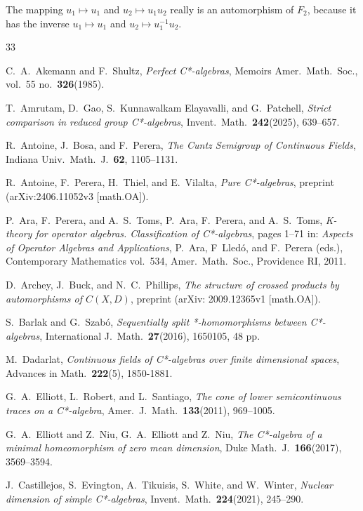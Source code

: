 \documentclass[10pt]{amsart}
\numberwithin{equation}{section}
\theoremstyle{definition}
\begin{document}
The mapping $u_1 \mapsto u_1$ and $u_2 \mapsto u_1 u_2$
really is an automorphism of $F_2$, because it has the
inverse $u_1 \mapsto u_1$ and $u_2 \mapsto u_1^{-1} u_2$.

\begin{thebibliography}{33}

 C.~A.\  Akemann and  F.~Shultz,
{\emph{Perfect C*-algebras}},
Memoirs Amer.\  Math.\  Soc., vol.~55 no.~{\textbf{326}}(1985).

T.~Amrutam, D.~Gao, S.~Kunnawalkam Elayavalli, and G.~Patchell,
{\emph{Strict comparison in reduced group C*-algebras}},
Invent.\  Math.\  {\textbf{242}}(2025), 639--657.

R.~Antoine, J.~Bosa, and F.~Perera,
{\emph{The Cuntz Semigroup of Continuous Fields}},
Indiana Univ.\  Math.\  J.\  {\textbf{62}}, 1105--1131.

R.~Antoine, F.~Perera, H.~Thiel, and E.~Vilalta,
{\emph{Pure C*-algebras}},
preprint (arXiv:2406.11052v3 [math.OA]).

P.~Ara, F.~Perera, and A.~S.\ Toms,
P.~Ara, F.~Perera, and A.~S.\  Toms,
{\emph{K-theory for operator algebras. Classification of C*-algebras}},
pages 1--71 in:
{\emph{Aspects of Operator Algebras and Applications}},
P.~Ara, F~Lled\'{o}, and F.~Perera (eds.),
Contemporary Mathematics vol.~534,
Amer.\  Math.\  Soc., Providence RI, 2011.

D.~Archey, J.~Buck, and N.~C.\ Phillips,
{\emph{The structure of
crossed products by automorphisms of $C (X, D)$}},
preprint (arXiv: 2009.12365v1 [math.OA]).

S.~Barlak and G.~Szab\'{o},
{\emph{Sequentially split *-homomorphisms between C*-algebras}},
International J.\  Math.\ {\textbf{27}}(2016), 1650105, 48 pp.

M.~Dadarlat,
{\emph{Continuous fields of C*-algebras over finite dimensional spaces}},
Advances in Math.\   {\textbf{222}}(5), 1850-1881.

G.~A.\  Elliott, L.~Robert, and L.~Santiago,
{\emph{The cone of lower semicontinuous traces on a C*-algebra}},
Amer.\  J.\  Math.\  {\textbf{133}}(2011), 969--1005.

 G.~A.\  Elliott and Z.~Niu,
G.~A.\  Elliott and Z.~Niu,
{\emph{The C*-algebra of a minimal homeomorphism of zero mean
  dimension}},
Duke Math.~J.\  {\textbf{166}}(2017), 3569--3594.

J.~Castillejos, S.~Evington, A.~Tikuisis, S.~White, and W.~Winter,
{\emph{Nuclear dimension of simple C*-algebras}},
Invent.\  Math.\  {\textbf{224}}(2021), 245--290.


\end{thebibliography}
\end{document}

